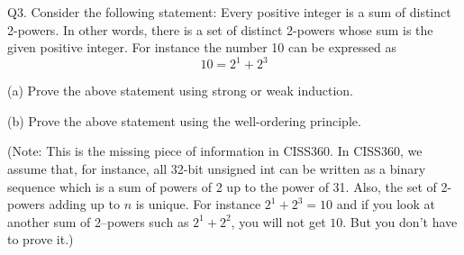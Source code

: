  
Q3.
Consider the following statement:
Every positive integer is a sum of distinct 2-powers.
In other words, there is a set of distinct 2-powers whose sum is the 
given positive integer.
For instance the number 10 can be expressed as
\[
10 = 2^1 + 2^3
\]

(a)
Prove the above statement using strong or weak induction.

(b)
Prove the above statement using the well-ordering principle.

(Note: This is the missing piece of information in CISS360.
In CISS360, we assume that, for instance, all 32-bit unsigned int
can be written as a binary sequence which is a sum of powers of 2
up to the power of 31.
Also, the set of 2-powers adding up to $n$ is unique.
For instance $2^1 + 2^3 = 10$ and if you look at another
sum of 2--powers such as $2^1 + 2^2$, you will not get $10$.
But you don't have to prove it.)

